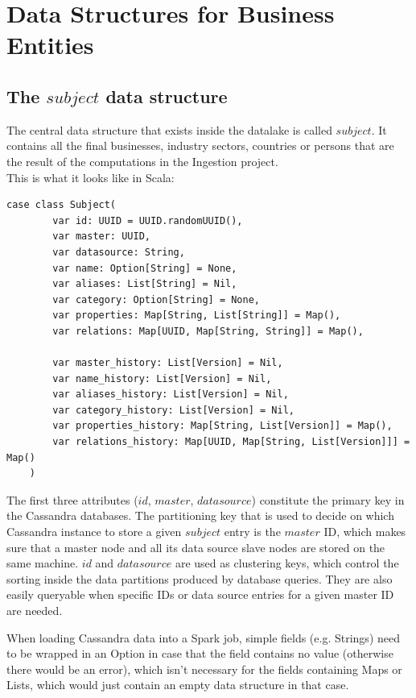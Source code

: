 \documentclass[
        a4paper,     %
        titlepage,   %
        oneside,     %
        parskip      %
        ]{scrartcl}  %
\begin{document}
  \section{Data Structures for Business Entities}
    \subsection{The $subject$ data structure}
    The central data structure that exists inside the datalake is called $subject$.
    It contains all the final businesses, industry sectors, countries or persons
    that are the result of the computations in the Ingestion project.\\
    This is what it looks like in Scala:
    \begin{lstlisting}[style=scalaStyle,caption=Subject]
    case class Subject(
    	var id: UUID = UUID.randomUUID(),
    	var master: UUID,
    	var datasource: String,
    	var name: Option[String] = None,
    	var aliases: List[String] = Nil,
    	var category: Option[String] = None,
    	var properties: Map[String, List[String]] = Map(),
    	var relations: Map[UUID, Map[String, String]] = Map(),

    	var master_history: List[Version] = Nil,
    	var name_history: List[Version] = Nil,
    	var aliases_history: List[Version] = Nil,
    	var category_history: List[Version] = Nil,
    	var properties_history: Map[String, List[Version]] = Map(),
    	var relations_history: Map[UUID, Map[String, List[Version]]] = Map()
    )
    \end{lstlisting}

    The first three attributes ($id$, $master$, $datasource$) constitute the
    primary key in the Cassandra databases.
    The partitioning key that is used to decide on which Cassandra instance to store
    a given $subject$ entry is the $master$ ID, which makes sure that a master node
    and all its data source slave nodes are stored on the same machine.
    $id$ and $datasource$ are used as clustering keys, which control the sorting
    inside the data partitions produced by database queries. They are also easily
    queryable when specific IDs or data source entries for a given master ID are
    needed.

    When loading Cassandra data into a Spark job, simple fields (e.g. Strings)
    need to be wrapped in an Option in case that the field contains no value
    (otherwise there would be an error), which isn't necessary for the fields
    containing Maps or Lists, which would just contain an empty data structure
    in that case.
\end{document}
